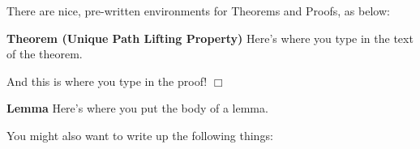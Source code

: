 \documentclass[12pt]{article}   %
\newenvironment{theorem}[1]{\vspace{.9cm}\noindent
    {\bf Theorem {#1}}}{\vspace{.1cm}}
\newenvironment{lemma}[1]{\vspace{.9cm}\noindent
    {\bf Lemma {#1}}}{\vspace{.1cm}}
\def\qed{\hfill $\Box$}
\newenvironment{proof}{\vspace{.5cm}
    \noindent{\bf Proof: }}{\qed \vspace{1cm}}
\begin{document}
\noindent There are nice, pre-written environments for Theorems and Proofs,
as below:

\begin{theorem}{(Unique Path Lifting Property)}
Here's where you type in the text of the theorem.
\end{theorem}

\begin{proof}
And this is where you type in the proof!
\end{proof}

\begin{lemma}
{} %
Here's where you put the body of a lemma.
\end{lemma}

\bigskip

\noindent You might also want to write up the following things:
\end{document}
